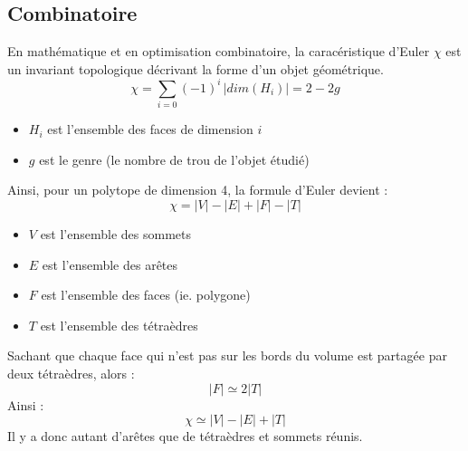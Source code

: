 \documentclass[a4paper,11pt,openany]{article}
\begin{document}
\subsection{Combinatoire}
\noindent
En mathématique et en optimisation combinatoire, la caracéristique d'Euler $\chi$ est un invariant topologique décrivant la forme d'un objet géométrique.
\begin{equation}
\chi = \sum_{i=0} (-1)^i \, |dim(H_i)| = 2-2g
\end{equation}
\begin{itemize}
\item $H_i$ est l'ensemble des faces de dimension $i$
\item $g$ est le genre (le nombre de trou de l'objet étudié)\\ 
\end{itemize}
Ainsi, pour un polytope de dimension 4, la formule d'Euler devient :\\
\begin{equation}
\chi = |V|-|E|+|F|-|T|
\end{equation}
\begin{itemize}
\item $V$ est l'ensemble des sommets
\item $E$ est l'ensemble des arêtes
\item $F$ est l'ensemble des faces (ie. polygone)
\item $T$ est l'ensemble des tétraèdres\\
\end{itemize}
Sachant que chaque face qui n'est pas sur les bords du volume est partagée par deux tétraèdres, alors :\\
\begin{equation}
|F|\simeq 2|T|
\end{equation}
Ainsi :
\begin{equation}
\chi \simeq |V|-|E|+|T|
\end{equation}
Il y a donc autant d'arêtes que de tétraèdres et sommets réunis.
\end{document}
